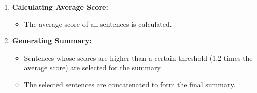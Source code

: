 \documentclass{ieeeaccess}
\begin{document}
\begin{enumerate}
    \item \textbf{Calculating Average Score:}
    \begin{itemize}
        \item The average score of all sentences is calculated.
    \end{itemize}
    
    \item \textbf{Generating Summary:}
    \begin{itemize}
        \item Sentences whose scores are higher than a certain threshold (1.2 times the average score) are selected for the summary.
        \item The selected sentences are concatenated to form the final summary.
    \end{itemize}
\end{enumerate}
\end{document}
